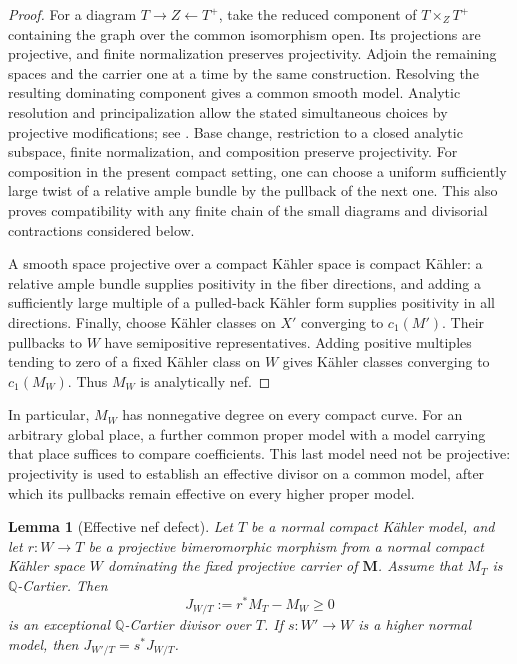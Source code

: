 \documentclass[11pt]{amsart}
\newtheorem{lemma}[theorem]{Lemma}
\theoremstyle{definition}
\theoremstyle{remark}
\numberwithin{equation}{section}
\newcommand{\Q}{\mathbb{Q}}
\newcommand{\M}{\mathbf{M}}
\begin{document}
\begin{proof}
For a diagram $T\to Z\leftarrow T^+$, take the reduced component of
$T\times_ZT^+$ containing the graph over the common isomorphism open.
Its projections are projective, and finite normalization preserves
projectivity.  Adjoin the remaining spaces and the carrier one at a
time by the same construction.  Resolving the resulting dominating
component gives a common smooth model.  Analytic resolution and
principalization allow the stated simultaneous choices by projective
modifications; see \cite[Theorems~1.6, 1.10 and 13.2(1)]{BierstoneMilman1997}.
Base change, restriction to a closed analytic subspace, finite
normalization, and composition preserve projectivity.  For composition
in the present compact setting, one can choose a uniform sufficiently
large twist of a relative ample bundle by the pullback of the next one.
This also proves compatibility with any finite chain of the small
diagrams and divisorial contractions considered below.

A smooth space projective over a compact K\"ahler space is compact
K\"ahler: a relative ample bundle supplies positivity in the fiber
directions, and adding a sufficiently large multiple of a pulled-back
K\"ahler form supplies positivity in all directions.  Finally, choose
K\"ahler classes on $X'$ converging to $c_1(M')$.  Their pullbacks to
$W$ have semipositive representatives.  Adding positive multiples
tending to zero of a fixed K\"ahler class on $W$ gives K\"ahler classes
converging to $c_1(M_W)$.  Thus $M_W$ is analytically nef.
\end{proof}

In particular, $M_W$ has nonnegative degree on every compact curve.
For an arbitrary global place, a further common proper model with a
model carrying that place suffices to compare coefficients.  This last
model need not be projective: projectivity is used to establish an
effective divisor on a common model, after which its pullbacks remain
effective on every higher proper model.

\begin{lemma}[Effective nef defect]\label{lem:nef-defect}
Let $T$ be a normal compact K\"ahler model, and let $r:W\to T$ be a
projective bimeromorphic morphism from a normal compact K\"ahler space
$W$ dominating the fixed projective carrier of $\M$.  Assume that
$M_T$ is $\Q$-Cartier.  Then
\begin{equation}\label{eq:nef-defect}
 J_{W/T}:=r^*M_T-M_W\geq0
\end{equation}
is an exceptional $\Q$-Cartier divisor over $T$.  If $s:W'\to W$ is
a higher normal model, then $J_{W'/T}=s^*J_{W/T}$.
\end{lemma}
\end{document}
